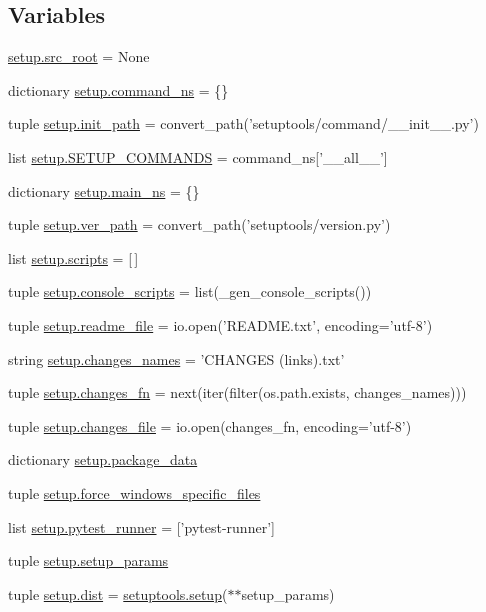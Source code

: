\subsection*{Variables}
\begin{DoxyCompactItemize}
\item 
\hyperlink{namespacesetup_ae9bb05a301a49b226da5490c01ad510d}{setup.\+src\+\_\+root} = None
\item 
dictionary \hyperlink{namespacesetup_a55a8bb7c0dc581c89cbf990807295b7e}{setup.\+command\+\_\+ns} = \{\}
\item 
tuple \hyperlink{namespacesetup_aca3048e48d7e4a7d100153796d6d4470}{setup.\+init\+\_\+path} = convert\+\_\+path('setuptools/command/\+\_\+\+\_\+init\+\_\+\+\_\+.\+py')
\item 
list \hyperlink{namespacesetup_ad634f515900f5c9b49cb6ac69ad546b4}{setup.\+S\+E\+T\+U\+P\+\_\+\+C\+O\+M\+M\+A\+N\+D\+S} = command\+\_\+ns\mbox{[}'\+\_\+\+\_\+all\+\_\+\+\_\+'\mbox{]}
\item 
dictionary \hyperlink{namespacesetup_a86bbd152e673af63b708489049e7bedf}{setup.\+main\+\_\+ns} = \{\}
\item 
tuple \hyperlink{namespacesetup_a56e14002a1e2d111442ce0f298be5416}{setup.\+ver\+\_\+path} = convert\+\_\+path('setuptools/version.\+py')
\item 
list \hyperlink{namespacesetup_ac1f45f8d37050b278bf63c812b1130dd}{setup.\+scripts} = \mbox{[}$\,$\mbox{]}
\item 
tuple \hyperlink{namespacesetup_a10945a835806c76e7354129a1d9feb8b}{setup.\+console\+\_\+scripts} = list(\+\_\+gen\+\_\+console\+\_\+scripts())
\item 
tuple \hyperlink{namespacesetup_acf45d1209932f3db88d362eef44dab40}{setup.\+readme\+\_\+file} = io.\+open('R\+E\+A\+D\+M\+E.\+txt', encoding='utf-\/8')
\item 
string \hyperlink{namespacesetup_a93d01281f56af17d3d990ce118f3b728}{setup.\+changes\+\_\+names} = 'C\+H\+A\+N\+G\+E\+S (links).txt'
\item 
tuple \hyperlink{namespacesetup_a0286b9f56b56f992bbbc2d5bdfa216ec}{setup.\+changes\+\_\+fn} = next(iter(filter(os.\+path.\+exists, changes\+\_\+names)))
\item 
tuple \hyperlink{namespacesetup_a98ece886ba0c7e21474b9d88033f479a}{setup.\+changes\+\_\+file} = io.\+open(changes\+\_\+fn, encoding='utf-\/8')
\item 
dictionary \hyperlink{namespacesetup_a9564b88d698a28beb160196680de9e7d}{setup.\+package\+\_\+data}
\item 
tuple \hyperlink{namespacesetup_a7425d7955eb1d8850e03b2f8123e86b2}{setup.\+force\+\_\+windows\+\_\+specific\+\_\+files}
\item 
list \hyperlink{namespacesetup_a760c878841954b4a84985b7d449e617d}{setup.\+pytest\+\_\+runner} = \mbox{[}'pytest-\/runner'\mbox{]}
\item 
tuple \hyperlink{namespacesetup_a0188e569cebc94a8a6c578f179344b24}{setup.\+setup\+\_\+params}
\item 
tuple \hyperlink{namespacesetup_ad7114a855c12c297b82441caa49ab0ba}{setup.\+dist} = \hyperlink{namespacesetuptools_a3347a1832befe1bf0e593b4c8bf7c9f8}{setuptools.\+setup}($\ast$$\ast$setup\+\_\+params)
\end{DoxyCompactItemize}
